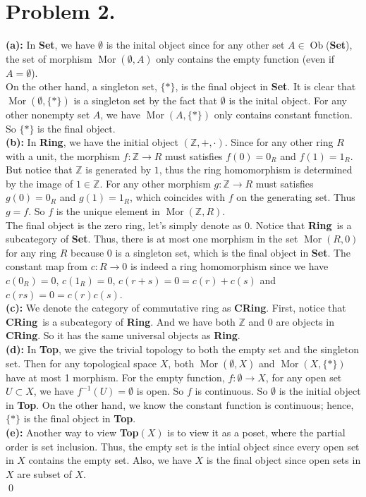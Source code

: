 \documentclass[12pt]{amsart}
\newcommand{\Z}{\mathbb{Z}}
\newcommand{\Mor}[0]{\operatorname{Mor}}
\newcommand{\Ob}[0]{\operatorname{Ob}}
\newcommand{\catname}[1]{{\normalfont\textbf{#1}}}
\newcommand{\Set}{\catname{Set}}
\newcommand{\Ring}{\catname{Ring}}
\newcommand{\CRing}{\catname{CRing}}
\newcommand{\Top}{\catname{Top}}
\begin{document}
\section*{Problem 2.}
\noindent\textbf{(a): } In \Set, we have $\emptyset$ is the inital object since for any other set $A\in\Ob$(\Set), the set of morphism $\Mor(\emptyset,A) $ only contains the empty function (even if $A=\emptyset$).\\
On the other hand, a singleton set, $\{\ast\}$, is the final object in \Set. It is clear that $\Mor(\emptyset,\{\ast\})$ is a singleton set by the fact that $\emptyset$ is the inital object. For any other nonempty set $A$, we have $\Mor(A,\{\ast\})$ only contains constant function. So $\{\ast\}$ is the final object.\\
\textbf{(b):} In \Ring, we have the initial object $(\Z,+,\cdot)$. Since for any other ring $R$ with a unit, the morphism $f:\Z\to R$ must satisfies $f(0)=0_R$ and $f(1)=1_R$. But notice that $\Z$ is generated by $1$, thus the ring homomorphism is determined by the image of $1\in\Z $. For any other morphism $g:\Z\to R$ must satisfies $g(0)=0_R$ and $g(1)=1_R$, which coincides with $f$ on the generating set. Thus $g=f$. So $f$ is the unique element in $\Mor(\Z,R)$.\\
The final object is the zero ring, let's simply denote as 0. Notice that \Ring \  is a subcategory of \Set. Thus, there is at most one morphism in the set $\Mor(R,0)$ for any ring $R$ because $0$ is a singleton set, which is the final object in \Set. The constant map from $c:R\to 0$ is indeed a ring homomorphism since we have $c(0_R)=0$, $c(1_R)=0$, $c(r+s)=0=c(r)+c(s)$ and $c(rs)=0=c(r)c(s)$.\\
\textbf{(c):} We denote the category of commutative ring as \CRing. First, notice that \CRing \ is a subcategory of \Ring. And we have both $\Z$ and $0$ are objects in \CRing. So it has the same universal objects as \Ring.\\
\textbf{(d):} In \Top, we give the trivial topology to both the empty set and the singleton set. Then for any topological space $X$, both $\Mor(\emptyset, X)$ and $\Mor(X,\{\ast\})$ have at most 1 morphism. For the empty function, $f:\emptyset\to X$, for any open set $U\subset X$, we have $f^{-1}(U)=\emptyset$ is open. So $f$ is continuous. So $\emptyset $ is the initial object in \Top. On the other hand, we know the constant function is continuous; hence, $\{\ast\}$ is the final object in \Top.\\
\textbf{(e):} Another way to view \Top$(X)$ is to view it as a poset, where the partial order is set inclusion. Thus, the empty set is the intial object since every open set in $X$ contains the empty set. Also, we have $X$ is the final object since open sets in $X$ are subset of $X$.\\\qed\\
\end{document}
